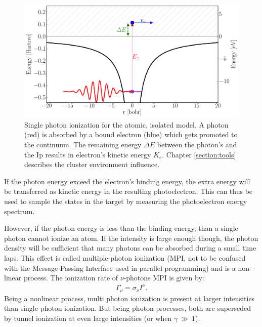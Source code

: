 \begin{figure}
 \centering
 \includegraphics[width=\figurewidth]{figures/ionization_single}
 \caption{Single photon ionization for the atomic, isolated model. A photon
          (red) is absorbed by a bound electron (blue) which gets promoted to
          the continuum. The remaining energy $\Delta E$ between the photon's
          and the Ip results in electron's kinetic energy $K_e$.
          Chapter \ref{section:tools} describes the cluster environment
          influence.}
 \label{fig:ionization:single}
\end{figure}

If the photon energy exceed the electron's binding energy, the extra energy
will be transferred as kinetic energy in the
resulting photoelectron. This can thus be used to sample the states in the
target by measuring the photoelectron energy spectrum\cite{Fennel2010}.

However, if the photon energy is less than the binding energy, than a single
photon cannot ionize an atom. If the intensity is large enough though, the
photon density will be sufficient that many photons can be absorbed during a
small time laps. This effect is called multiple-photon ionization (MPI, not to
be confused with the Message Passing Interface used in parallel programming) and
is a non-linear process. The ionization rate of $\nu$-photons MPI is given
by\cite{Fennel2010}:
\begin{align}
\Gamma_{\nu} = \sigma_{\nu} I^{\nu}.
\label{eqn:ionization:rate:mpi}
\end{align}
Being a nonlinear process, multi photon ionization is present at larger
intensities than single photon ionization. But being photon processes, both are
superseded by tunnel ionization at even large intensities (or when
$\gamma~\gg~1$).



